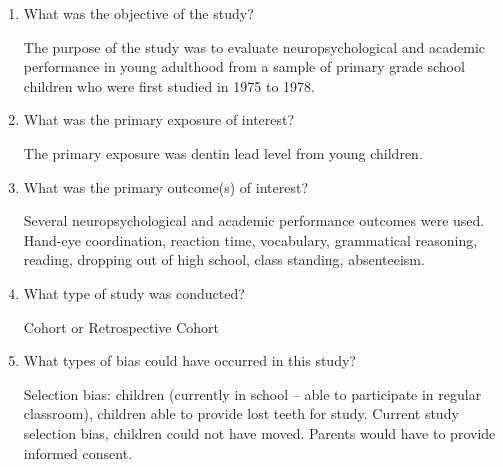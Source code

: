 \begin{enumerate}

\item What was the objective of the study?

\answerSpace{3cm}

\begin{AnswerText}
The purpose of the study was to evaluate neuropsychological and academic performance in young adulthood from a sample of primary grade school children who were first studied in 1975 to 1978.
\end{AnswerText}

\item What was the primary exposure of interest?
\answerSpace{1cm}

\begin{AnswerText}
The primary exposure was dentin lead level from young children.
\end{AnswerText}

\item What was the primary outcome(s) of interest?

\answerSpace{1cm}

\begin{AnswerText}
Several neuropsychological and academic performance outcomes were used.  
Hand-eye coordination, reaction time, vocabulary, grammatical reasoning, reading, dropping out of high school, class standing, absenteeism.
\end{AnswerText}

\item What type of study was conducted?

\answerSpace{1cm}

\begin{AnswerText}
Cohort or Retrospective Cohort
\end{AnswerText}

%
%


\item What types of bias could have occurred in this study?

\answerSpace{1cm}

\begin{AnswerText}
Selection bias:  children (currently in school – able to participate in regular classroom), children able to provide lost teeth for study.  Current study selection bias, children could not have moved.  Parents would have to provide informed consent.
\end{AnswerText}


\end{enumerate}
